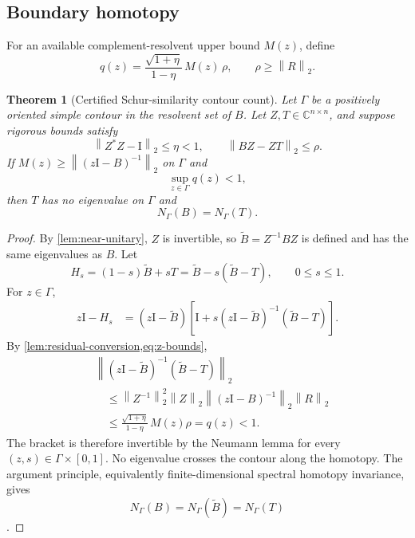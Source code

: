 \documentclass[11pt]{article}
\newtheorem{theorem}{Theorem}[section]
\theoremstyle{definition}
\theoremstyle{remark}
\newcommand{\C}{\mathbb C}
\newcommand{\Id}{\mathrm I}
\newcommand{\norm}[1]{\left\lVert#1\right\rVert}
\begin{document}
\subsection{Boundary homotopy}

For an available complement-resolvent upper bound \(M(z)\), define
\begin{equation}
 q(z)=
 \frac{\sqrt{1+\eta}}{1-\eta}\,
 M(z)\,\rho,
 \qquad
 \rho\geq\norm{R}_2.
 \label{eq:q-definition}
\end{equation}

\begin{theorem}[Certified Schur-similarity contour count]
\label{thm:schur-count}
Let \(\Gamma\) be a positively oriented simple contour in the resolvent set
of \(B\).  Let \(Z,T\in\C^{n\times n}\), and suppose rigorous bounds satisfy
\[
 \norm{Z^*Z-\Id}_2\leq\eta<1,\qquad
 \norm{BZ-ZT}_2\leq\rho.
\]
If \(M(z)\geq\norm{(z\Id-B)^{-1}}_2\) on \(\Gamma\) and
\begin{equation}
 \sup_{z\in\Gamma}q(z)<1,
 \label{eq:q-gate}
\end{equation}
then \(T\) has no eigenvalue on \(\Gamma\) and
\begin{equation}
 N_\Gamma(B)=N_\Gamma(T).
 \label{eq:count-equivalence}
\end{equation}
\end{theorem}

\begin{proof}
By \cref{lem:near-unitary}, \(Z\) is invertible, so
\(\widetilde B=Z^{-1}BZ\) is defined and has the same eigenvalues as \(B\).
Let
\[
 H_s=(1-s)\widetilde B+sT
     =\widetilde B-s(\widetilde B-T),
 \qquad 0\leq s\leq1.
\]
For \(z\in\Gamma\),
\begin{align*}
 z\Id-H_s
 &=(z\Id-\widetilde B)
 \left[
  \Id+s(z\Id-\widetilde B)^{-1}(\widetilde B-T)
 \right].
\end{align*}
By \cref{lem:residual-conversion,eq:z-bounds},
\begin{align*}
 &\norm{(z\Id-\widetilde B)^{-1}(\widetilde B-T)}_2\\
 &\quad\leq
 \norm{Z^{-1}}_2^2\norm{Z}_2
 \norm{(z\Id-B)^{-1}}_2\norm{R}_2\\
 &\quad\leq
 \frac{\sqrt{1+\eta}}{1-\eta}\,M(z)\rho
 =q(z)<1.
\end{align*}
The bracket is therefore invertible by the Neumann lemma for every
\((z,s)\in\Gamma\times[0,1]\).  No eigenvalue crosses the contour along the
homotopy.  The argument principle, equivalently finite-dimensional spectral
homotopy invariance, gives
\[
 N_\Gamma(B)=N_\Gamma(\widetilde B)=N_\Gamma(T)
\]
\citep{Ahlfors1979,Kato1995,GohbergSigal1971}.
\end{proof}
\end{document}
